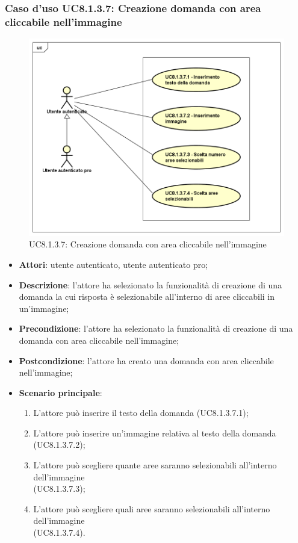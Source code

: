 \subsubsection{Caso d'uso UC8.1.3.7: Creazione domanda con area cliccabile nell'immagine}
\label{UC8.1.3.7}
\begin{figure}[h]
	\centering
	\includegraphics[scale=0.5,keepaspectratio]{UML/UC8_1_3_7.png}
	\caption{UC8.1.3.7: Creazione domanda con area cliccabile nell'immagine}
\end{figure}
\FloatBarrier
\begin{itemize}
	\item \textbf{Attori}: utente autenticato, utente autenticato pro;
	\item \textbf{Descrizione}: l'attore ha selezionato la funzionalità di creazione di una domanda la cui risposta è selezionabile all'interno di aree cliccabili in un'immagine;
	\item \textbf{Precondizione}: l'attore ha selezionato la funzionalità di creazione di una domanda con area cliccabile nell'immagine; 
	\item \textbf{Postcondizione}: l'attore ha creato una domanda con area cliccabile nell'immagine;
	\item \textbf{Scenario principale}:
		\begin{enumerate}
	       	\item L'attore può inserire il testo della domanda (UC8.1.3.7.1);
	        \item L'attore può inserire un'immagine relativa al testo della domanda (UC8.1.3.7.2);
		\item L'attore può scegliere quante aree saranno selezionabili all'interno dell'immagine \\(UC8.1.3.7.3);
		\item L'attore può scegliere quali aree saranno selezionabili all'interno dell'immagine \\(UC8.1.3.7.4).
	 	\end{enumerate}
\end{itemize}

